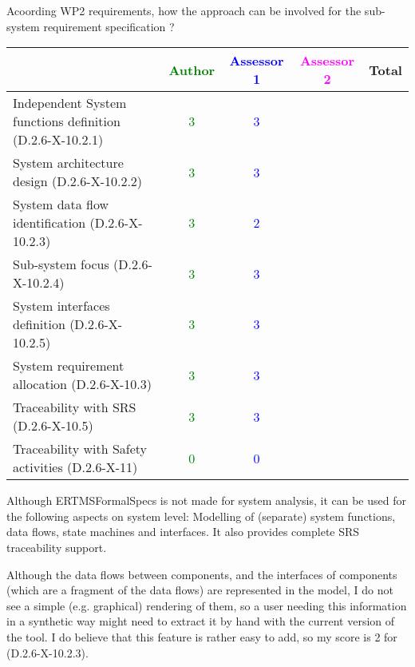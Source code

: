 Acoording WP2 requirements, how the approach can be involved for the sub-system requirement specification ?

\begin{tabular}{|l | c | c | c | c|}
\hline
& \textcolor{green}{Author} & \textcolor{blue}{Assessor 1} & \textcolor{magenta}{Assessor 2} & Total \\
\hline
Independent System functions definition (D.2.6-X-10.2.1)  & \textcolor{green}{3} & \textcolor{blue}{3} & &  \\
\hline 
System architecture design (D.2.6-X-10.2.2) & \textcolor{green}{3} & \textcolor{blue}{3} & &  \\
\hline
System data flow identification (D.2.6-X-10.2.3)  & \textcolor{green}{3} & \textcolor{blue}{2} & &  \\
\hline
Sub-system focus (D.2.6-X-10.2.4)  & \textcolor{green}{3} & \textcolor{blue}{3} & &  \\
\hline
System interfaces definition (D.2.6-X-10.2.5)  & \textcolor{green}{3} & \textcolor{blue}{3} & &  \\
\hline
System requirement allocation (D.2.6-X-10.3)  & \textcolor{green}{3} & \textcolor{blue}{3} & &  \\
\hline
Traceability with SRS (D.2.6-X-10.5)  & \textcolor{green}{3} & \textcolor{blue}{3} & &  \\
\hline
Traceability with Safety activities (D.2.6-X-11)  & \textcolor{green}{0} & \textcolor{blue}{0} & &  \\
\hline
\end{tabular}

\begin{author_comment}
Although ERTMSFormalSpecs is not made for system analysis, it can be used for the following aspects on system level: Modelling of (separate) system functions, data flows, state machines and interfaces. It also provides complete SRS traceability support.  
\end{author_comment}

\begin{assessor1}
Although the data flows between components, and the interfaces of components (which are a fragment of the data flows) are represented in the model, I do not see a simple (e.g. graphical) rendering of them, so a user needing this information in a synthetic way might need to extract it by hand with the current version of the tool. I do believe that this feature is rather easy to add, so my score is 2 for (D.2.6-X-10.2.3). 
\end{assessor1}

